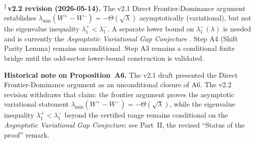 \documentclass[12pt,a4paper]{article}
\theoremstyle{definition}
\theoremstyle{remark}
\begin{document}
\begin{center}
\renewcommand{\arraystretch}{1.3}

\medskip
\noindent\textsuperscript{$\ddagger$}\,\textbf{v2.2 revision (2026-05-14).} The
v2.1 Direct Frontier-Dominance argument establishes
$\lambda_{\min}(W^+-W^-)=-\Theta(\sqrt\lambda)$ asymptotically (variational), but
not the eigenvalue inequality $\lambda_1^+<\lambda_1^-$.  A separate lower
bound on $\lambda_1^-(\lambda)$ is needed and is currently the
\emph{Asymptotic Variational Gap Conjecture} \cite{Geiger2026evendom}.
Step A4 (Shift Parity Lemma) remains unconditional. Step A3 remains a
conditional finite bridge until the odd-sector lower-bound construction is
validated.
\end{center}

\noindent\textbf{Historical note on Proposition~A6.} The v2.1 draft presented
the Direct Frontier-Dominance argument as an unconditional closure of A6. The
v2.2 revision withdraws that claim: the frontier argument proves the
asymptotic variational statement
$\lambda_{\min}(W^+-W^-)=-\Theta(\sqrt\lambda)$, while the eigenvalue
inequality $\lambda_1^+<\lambda_1^-$ beyond the certified range remains
conditional on the \emph{Asymptotic Variational Gap Conjecture}; see
Part~II, the revised ``Status of the proof'' remark.
\end{document}
